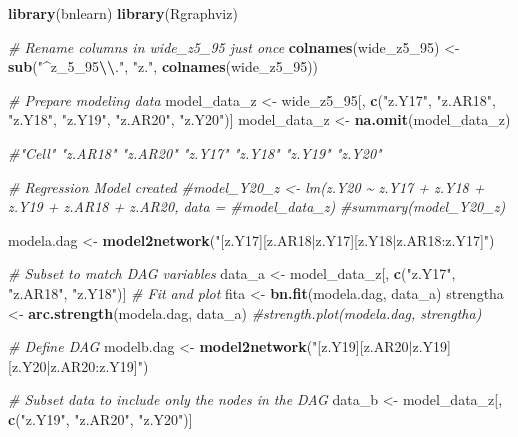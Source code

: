 \documentclass[
]{article}
\newenvironment{Shaded}{\begin{snugshade}}{\end{snugshade}}
\newcommand{\CommentTok}[1]{\textcolor[rgb]{0.56,0.35,0.01}{\textit{#1}}}
\newcommand{\FunctionTok}[1]{\textcolor[rgb]{0.13,0.29,0.53}{\textbf{#1}}}
\newcommand{\NormalTok}[1]{#1}
\newcommand{\OtherTok}[1]{\textcolor[rgb]{0.56,0.35,0.01}{#1}}
\newcommand{\SpecialCharTok}[1]{\textcolor[rgb]{0.81,0.36,0.00}{\textbf{#1}}}
\newcommand{\StringTok}[1]{\textcolor[rgb]{0.31,0.60,0.02}{#1}}
\begin{document}
\begin{Shaded}
\begin{Highlighting}[]
\FunctionTok{library}\NormalTok{(bnlearn)}
\FunctionTok{library}\NormalTok{(Rgraphviz)}

\CommentTok{\# Rename columns in wide\_z5\_95 just once}
\FunctionTok{colnames}\NormalTok{(wide\_z5\_95) }\OtherTok{\textless{}{-}} \FunctionTok{sub}\NormalTok{(}\StringTok{"\^{}z\_5\_95}\SpecialCharTok{\textbackslash{}\textbackslash{}}\StringTok{."}\NormalTok{, }\StringTok{"z."}\NormalTok{, }\FunctionTok{colnames}\NormalTok{(wide\_z5\_95))}

\CommentTok{\# Prepare modeling data}
\NormalTok{model\_data\_z }\OtherTok{\textless{}{-}}\NormalTok{ wide\_z5\_95[, }\FunctionTok{c}\NormalTok{(}\StringTok{"z.Y17"}\NormalTok{, }\StringTok{"z.AR18"}\NormalTok{, }\StringTok{"z.Y18"}\NormalTok{, }\StringTok{"z.Y19"}\NormalTok{, }\StringTok{"z.AR20"}\NormalTok{, }\StringTok{"z.Y20"}\NormalTok{)]}
\NormalTok{model\_data\_z }\OtherTok{\textless{}{-}} \FunctionTok{na.omit}\NormalTok{(model\_data\_z)}

\CommentTok{\#"Cell"   "z.AR18" "z.AR20" "z.Y17"  "z.Y18"  "z.Y19"  "z.Y20" }

\CommentTok{\# Regression Model created}
\CommentTok{\#model\_Y20\_z \textless{}{-} lm(z.Y20 \textasciitilde{} z.Y17 + z.Y18 + z.Y19 + z.AR18 + z.AR20, data = \#model\_data\_z)}
\CommentTok{\#summary(model\_Y20\_z)}

\NormalTok{modela.dag }\OtherTok{\textless{}{-}} \FunctionTok{model2network}\NormalTok{(}\StringTok{"[z.Y17][z.AR18|z.Y17][z.Y18|z.AR18:z.Y17]"}\NormalTok{)}

\CommentTok{\# Subset to match DAG variables}
\NormalTok{data\_a }\OtherTok{\textless{}{-}}\NormalTok{ model\_data\_z[, }\FunctionTok{c}\NormalTok{(}\StringTok{"z.Y17"}\NormalTok{, }\StringTok{"z.AR18"}\NormalTok{, }\StringTok{"z.Y18"}\NormalTok{)]}
\CommentTok{\# Fit and plot}
\NormalTok{fita }\OtherTok{\textless{}{-}} \FunctionTok{bn.fit}\NormalTok{(modela.dag, data\_a)}
\NormalTok{strengtha }\OtherTok{\textless{}{-}} \FunctionTok{arc.strength}\NormalTok{(modela.dag, data\_a)}
\CommentTok{\#strength.plot(modela.dag, strengtha)}

\CommentTok{\# Define DAG}
\NormalTok{modelb.dag }\OtherTok{\textless{}{-}} \FunctionTok{model2network}\NormalTok{(}\StringTok{"[z.Y19][z.AR20|z.Y19][z.Y20|z.AR20:z.Y19]"}\NormalTok{)}

\CommentTok{\# Subset data to include only the nodes in the DAG}
\NormalTok{data\_b }\OtherTok{\textless{}{-}}\NormalTok{ model\_data\_z[, }\FunctionTok{c}\NormalTok{(}\StringTok{"z.Y19"}\NormalTok{, }\StringTok{"z.AR20"}\NormalTok{, }\StringTok{"z.Y20"}\NormalTok{)]}


\end{Highlighting}
\end{Shaded}
\end{document}
